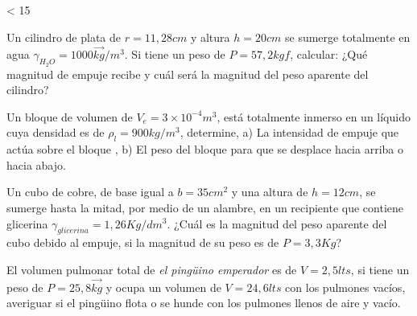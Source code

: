 \documentclass[./examen.tex]{subfiles}
\newcounter{z}
\newcommand\y[2]{
  \loop \ifnum\value{z} < #1
    #2%
    \stepcounter{z}%
  \repeat
}
\begin{document}
\y{15}{
\begin{center}

\makebox[\textwidth]{Nombre y Apellido:\enspace\hrulefill}
\end{center}
\begin{questions}
\small
\question[2] Un cilindro de plata de $r=11,28cm$ y altura $h=20cm$ se sumerge totalmente en agua $\gamma_{H_2O}=1000\vec{kg}/m^3$. Si tiene un peso de $P=57,2kgf$, calcular: ¿Qué magnitud de empuje recibe y cuál será la magnitud del peso aparente del cilindro?

\question[2] Un bloque de volumen de $V_e=3 \times 10^{-4}m^3$, está totalmente inmerso en un líquido cuya densidad es de $\rho_{l}=900 kg/m^3$, determine, a) La intensidad de empuje que actúa sobre el bloque , b) El peso del bloque para que se desplace hacia arriba o hacia abajo. 

\question[3] Un cubo de cobre, de base igual a $b=35cm^2$ y una altura de $h=12 cm$, se sumerge hasta la mitad, por medio de un alambre, en un recipiente que contiene glicerina $\gamma_{glicerina}=1,26Kg/dm^3$.  ¿Cuál es la magnitud del peso aparente del cubo debido al empuje, si la magnitud de su peso es de $P=3,3 Kg$?

\question[3] El volumen pulmonar total de \emph{el pingüino emperador} es de $V=2,5lts$, si tiene un peso de $P=25,8\vec{kg}$ y ocupa un volumen de $V=24,6lts$ con los pulmones vacíos, averiguar si el pingüino flota o se hunde con los pulmones llenos de aire y vacío.

\end{questions}

}
\end{document}
